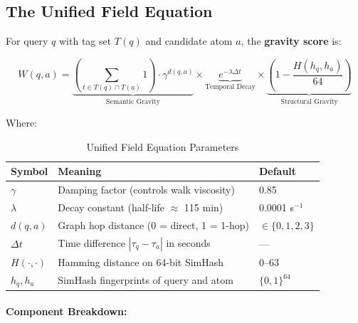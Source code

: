 \documentclass[11pt]{article}
\begin{document}
\subsection{The Unified Field Equation}

For query $q$ with tag set $T(q)$ and candidate atom $a$, the \textbf{gravity score} is:

\begin{equation}
\label{eq:unified_field}
W(q, a) = \underbrace{\left(\sum_{t \in T(q) \cap T(a)} 1\right) \cdot \gamma^{d(q,a)}}_{\text{Semantic Gravity}} \times \underbrace{e^{-\lambda \Delta t}}_{\text{Temporal Decay}} \times \underbrace{\left(1 - \frac{H(h_q, h_a)}{64}\right)}_{\text{Structural Gravity}}
\end{equation}

Where:

\begin{table}[h]
\centering
\caption{Unified Field Equation Parameters}
\label{tab:parameters}
\begin{tabular}{@{}lll@{}}
\toprule
\textbf{Symbol} & \textbf{Meaning} & \textbf{Default} \\ \midrule
$\gamma$ & Damping factor (controls walk viscosity) & 0.85 \\
$\lambda$ & Decay constant (half-life $\approx$ 115 min) & 0.0001 s$^{-1}$ \\
$d(q,a)$ & Graph hop distance (0 = direct, 1 = 1-hop) & $\in \{0,1,2,3\}$ \\
$\Delta t$ & Time difference $|\tau_q - \tau_a|$ in seconds & --- \\
$H(\cdot,\cdot)$ & Hamming distance on 64-bit SimHash & 0--63 \\
$h_q, h_a$ & SimHash fingerprints of query and atom & $\{0,1\}^{64}$ \\ \bottomrule
\end{tabular}
\end{table}

\paragraph{Component Breakdown:}
\end{document}
